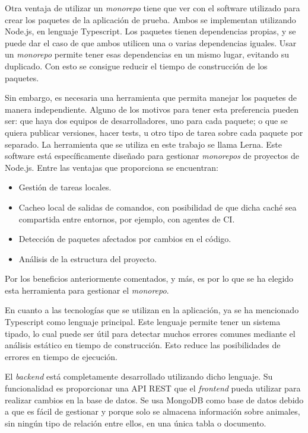 Otra ventaja de utilizar un \textit{monorepo} tiene que ver con el software utilizado para crear los paquetes de la aplicación de prueba. Ambos se implementan utilizando Node.js, en lenguaje Typescript\cite{ts}. Los paquetes tienen dependencias propias, y se puede dar el caso de que ambos utilicen una o varias dependencias iguales. Usar un \textit{monorepo} permite tener esas dependencias en un mismo lugar, evitando su duplicado. Con esto se consigue reducir el tiempo de construcción de los paquetes.

Sin embargo, es necesaria una herramienta que permita manejar los paquetes de manera independiente. Alguno de los motivos para tener esta preferencia pueden ser: que haya dos equipos de desarrolladores, uno para cada paquete; o que se quiera publicar versiones, hacer tests, u otro tipo de tarea sobre cada paquete por separado. La herramienta que se utiliza en este trabajo se llama Lerna\cite{lerna}. Este software está específicamente diseñado para gestionar \textit{monorepos} de proyectos de Node.js. Entre las ventajas que proporciona se encuentran:

\begin{itemize}
  \item Gestión de tareas locales.
  \item Cacheo local de salidas de comandos, con posibilidad de que dicha caché sea compartida entre entornos, por ejemplo, con agentes de CI.
  \item Detección de paquetes afectados por cambios en el código.
  \item Análisis de la estructura del proyecto.
\end{itemize}

Por los beneficios anteriormente comentados, y más, es por lo que se ha elegido esta herramienta para gestionar el \textit{monorepo}.

En cuanto a las tecnologías que se utilizan en la aplicación, ya se ha mencionado Typescript como lenguaje principal. Este lenguaje permite tener un sistema tipado, lo cual puede ser útil para detectar muchos errores comunes mediante el análisis estático en tiempo de construcción. Esto reduce las posibilidades de errores en tiempo de ejecución.

El \textit{backend} está completamente desarrollado utilizando dicho lenguaje. Su funcionalidad es proporcionar una API REST que el \textit{frontend} pueda utilizar para realizar cambios en la base de datos. Se usa MongoDB\cite{mongodb} como base de datos debido a que es fácil de gestionar y porque solo se almacena información sobre animales, sin ningún tipo de relación entre ellos, en una única tabla o documento.

